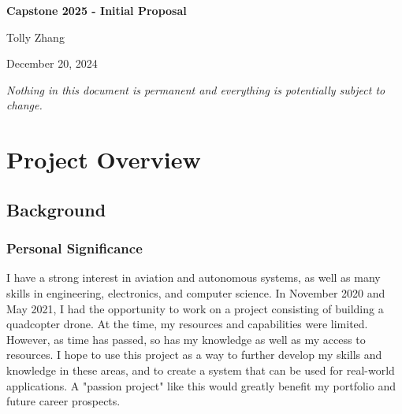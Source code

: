 \documentclass[12pt]{article}
\begin{document}
\begin{titlepage}
    \centering
    \vfill
    \vspace*{2.5in}
    {\Huge\bfseries Capstone 2025 - Initial Proposal \par}
    \vspace{0.2in}
    {\LARGE Tolly Zhang \par}    
    \vspace{0.2in}
    {\LARGE December 20, 2024 \par}
    \vfill
\end{titlepage}

\newpage
\thispagestyle{empty}
\begin{center}
    \vspace*{\fill}
    \Large\textit{Nothing in this document is permanent and everything is potentially subject to change.}
    \vspace*{\fill}
\end{center}

\newpage
{}
\setcounter{page}{1}

\section{Project Overview}
\subsection{Background}

\subsubsection{Personal Significance}
I have a strong interest in aviation and autonomous systems, as well as many skills in engineering, electronics, and computer science. In November 2020 and May 2021, I had the opportunity to work on a project consisting of building a quadcopter drone. At the time, my resources and capabilities were limited. However, as time has passed, so has my knowledge as well as my access to resources. I hope to use this project as a way to further develop my skills and knowledge in these areas, and to create a system that can be used for real-world applications. A "passion project" like this would greatly benefit my portfolio and future career prospects.
\end{document}
